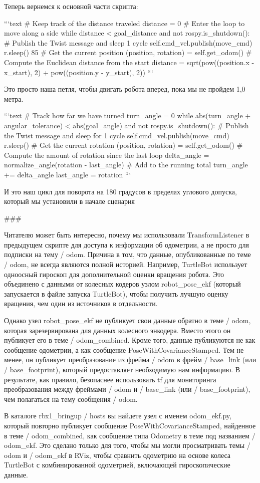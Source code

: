 Теперь вернемся к основной части скрипта:

```text
# Keep track of the distance traveled
distance = 0
# Enter the loop to move along a side
while distance < goal_distance and not rospy.is_shutdown():
# Publish the Twist message and sleep 1 cycle
self.cmd_vel.publish(move_cmd)
r.sleep() 85
# Get the current position
(position, rotation) = self.get_odom()
# Compute the Euclidean distance from the start
distance = sqrt(pow((position.x - x_start), 2) +
pow((position.y - y_start), 2))
```

Это просто наша петля, чтобы двигать робота вперед, пока мы не пройдем 1,0 метра.

```text
# Track how far we have turned
turn_angle = 0
while abs(turn_angle + angular_tolerance) < abs(goal_angle) and not rospy.is_shutdown():
# Publish the Twist message and sleep for 1 cycle
self.cmd_vel.publish(move_cmd)
r.sleep()
# Get the current rotation
(position, rotation) = self.get_odom()
# Compute the amount of rotation since the last loop
delta_angle = normalize_angle(rotation - last_angle)
# Add to the running total
turn_angle += delta_angle
last_angle = rotation
```

И это наш цикл для поворота на 180 градусов в пределах углового допуска, который мы установили в начале сценария

###

Читателю может быть интересно, почему мы использовали TransformListener в предыдущем скрипте для доступа к информации об одометрии, а не просто для подписки на тему / odom. Причина в том, что данные, опубликованные по теме / odom, не всегда являются полной историей. Например, TurtleBot использует одноосный гироскоп для дополнительной оценки вращения робота. Это объединено с данными от колесных кодеров узлом robot\_pose\_ekf (который запускается в файле запуска TurtleBot), чтобы получить лучшую оценку вращения, чем один из источников в отдельности.

Однако узел robot\_pose\_ekf не публикует свои данные обратно в теме / odom, которая зарезервирована для данных колесного энкодера. Вместо этого он публикует его в теме / odom\_combined. Кроме того, данные публикуются не как сообщение одометрии, а как сообщение PoseWithCovarianceStamped. Тем не менее, он публикует преобразование из фрейма / odom в фрейм / base\_link (или / base\_footprint), который предоставляет необходимую нам информацию. В результате, как правило, безопаснее использовать tf для мониторинга преобразования между фреймами / odom и / base\_link (или / base\_footprint), чем полагаться на тему сообщения / odom.

В каталоге rbx1\_bringup / hosts вы найдете узел с именем odom\_ekf.py, который повторно публикует сообщение PoseWithCovarianceStamped, найденное в теме / odom\_combined, как сообщение типа Odometry в теме под названием / odom\_ekf. Это сделано только для того, чтобы мы могли просматривать темы / odom и / odom\_ekf в RViz, чтобы сравнить одометрию на основе колеса TurtleBot с комбинированной одометрией, включающей гироскопические данные.


